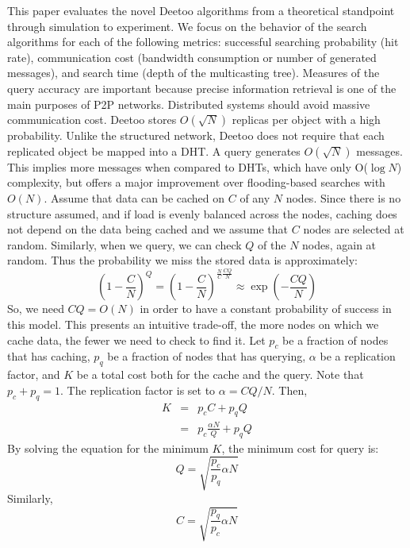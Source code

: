 \documentclass[9.5pt,journal,final,finalsubmission,twocolumn]{IEEEtran}
\begin{document}
This paper evaluates the novel Deetoo algorithms from a theoretical 
standpoint through simulation to experiment. 
We focus on the behavior of the search algorithms for each of the
following metrics: successful searching probability (hit rate),
communication cost (bandwidth consumption or number of
generated messages), and search time (depth of the multicasting tree). 
Measures of the query accuracy are important because precise information 
retrieval is one of the main purposes of P2P networks. 
Distributed systems should avoid massive communication cost. Deetoo stores 
$O(\sqrt{N})$ replicas per object with a high probability. 
Unlike the structured network, Deetoo does not require that each replicated object 
be mapped into a DHT.
A query generates $O(\sqrt{N})$ messages.
This implies more messages when compared to DHTs, which have only O($\log N$) complexity,
but offers a major improvement over flooding-based searches with
$O(N)$.
Assume that data can be cached on $C$ of any $N$ nodes.
Since there is no structure assumed, and if load is evenly
balanced across the nodes,
caching does not depend on the data
being cached and we assume that $C$ nodes are selected at random.  Similarly,
when we query, we can check $Q$ of the $N$ nodes, again at random.  Thus the
probability we miss the stored data is approximately:
\[
\left(1-\frac{C}{N}\right)^Q = \left(1-\frac{C}{N}\right)^{\frac{N}{C}
\frac{CQ}{N}}\approx \exp(-\frac{CQ}{N})
\]
So, we need $CQ = O(N)$ in order to have a constant probability of success in
this model.  This presents an intuitive trade-off, the more nodes on which we
cache data, the fewer we need to check to find it.  
Let $p_c$ be a fraction of nodes that has caching, $p_q$ be a fraction of nodes
that has  
querying, $\alpha$ be a replication factor, and $K$ be a total cost both 
for the cache and the query. Note that $p_c +p_q=1$. 
The replication factor is set to $\alpha=CQ/N$.
Then, 
\begin{eqnarray}
K&=&p_cC+p_qQ \\
 &=&p_c\frac{\alpha N}{Q}+p_qQ
\end{eqnarray}
By solving the equation for the minimum $K$, the minimum cost for
query is:
\begin{equation}\label{eq:c_cost}
Q = \sqrt{\frac{p_c}{p_q}\alpha N}
\end{equation} 
Similarly, 
\begin{equation}\label{eq:q_cost}
C = \sqrt{\frac{p_q}{p_c}\alpha N}
\end{equation}
\end{document}
